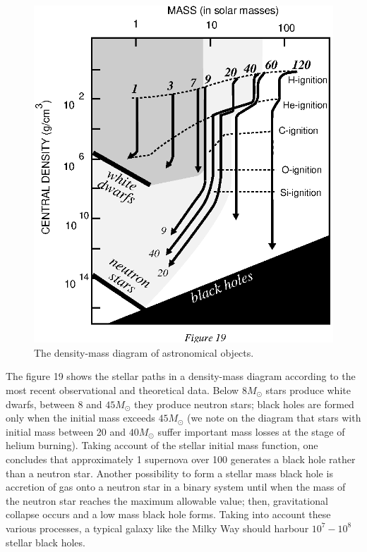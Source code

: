 \documentclass{lamuphys}
\begin{document}
\begin{figure}[tb]
  \begin{center}
    \leavevmode
    \includegraphics{evol.ps}
    \caption{The density-mass diagram of astronomical objects.}
  \end{center}
\end{figure}
The figure 19 shows the stellar paths in a
density-mass diagram according to the most recent observational and 
theoretical data. Below $8 M_{\odot}$ stars produce white dwarfs, between 8 and $45
M_{\odot}$ they produce neutron stars; black holes are formed only 
when the initial mass
exceeds $45 M_{\odot}$ (we note on the diagram that stars with 
initial mass between 20 and $40 M_{\odot}$ suffer important mass 
losses at the stage of helium burning). 
Taking account of the stellar initial mass function, one concludes that 
approximately 1 supernova
over 100 generates a black hole rather than a neutron star.
Another possibility to form a stellar mass black hole is
accretion of gas onto a neutron star in a binary system until when the mass of
the neutron star reaches the maximum allowable value; then, gravitational 
collapse
occurs and a low mass black hole forms. 
Taking into account these various processes, a typical galaxy like the Milky 
Way should harbour $10^7 - 10^8$ stellar black holes.
\end{document}
